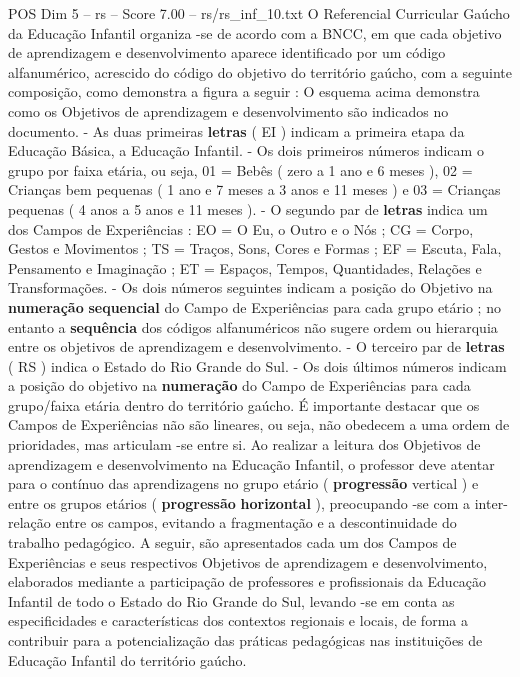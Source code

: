 \begin{textsample}{POS Dim 5 – rs – Score 7.00 – rs/rs\_inf\_10.txt}
O Referencial Curricular Gaúcho da Educação Infantil organiza -se de acordo com a BNCC, em que cada objetivo de aprendizagem e desenvolvimento aparece identificado por um código alfanumérico, acrescido do código do objetivo do território gaúcho, com a seguinte composição, como demonstra a figura a seguir : O esquema acima demonstra como os Objetivos de aprendizagem e desenvolvimento são indicados no documento. - As duas primeiras \textbf{letras} ( EI ) indicam a primeira etapa da Educação Básica, a Educação Infantil. - Os dois primeiros números indicam o grupo por faixa etária, ou seja, 01 = Bebês ( zero a 1 ano e 6 meses ), 02 = Crianças bem pequenas ( 1 ano e 7 meses a 3 anos e 11 meses ) e 03 = Crianças pequenas ( 4 anos a 5 anos e 11 meses ). - O segundo par de \textbf{letras} indica um dos Campos de Experiências : EO = O Eu, o Outro e o Nós ; CG = Corpo, Gestos e Movimentos ; TS = Traços, Sons, Cores e Formas ; EF = Escuta, Fala, Pensamento e Imaginação ; ET = Espaços, Tempos, Quantidades, Relações e Transformações. - Os dois números seguintes indicam a posição do Objetivo na \textbf{numeração} \textbf{sequencial} do Campo de Experiências para cada grupo etário ; no entanto a \textbf{sequência} dos códigos alfanuméricos não sugere ordem ou hierarquia entre os objetivos de aprendizagem e desenvolvimento. - O terceiro par de \textbf{letras} ( RS ) indica o Estado do Rio Grande do Sul. - Os dois últimos números indicam a posição do objetivo na \textbf{numeração} do Campo de Experiências para cada grupo/faixa etária dentro do território gaúcho.
É importante destacar que os Campos de Experiências não são lineares, ou seja, não obedecem a uma ordem de prioridades, mas articulam -se entre si.
Ao realizar a leitura dos Objetivos de aprendizagem e desenvolvimento na Educação Infantil, o professor deve atentar para o contínuo das aprendizagens no grupo etário ( \textbf{progressão} vertical ) e entre os grupos etários ( \textbf{progressão} \textbf{horizontal} ), preocupando -se com a inter-relação entre os campos, evitando a fragmentação e a descontinuidade do trabalho pedagógico.
A seguir, são apresentados cada um dos Campos de Experiências e seus respectivos Objetivos de aprendizagem e desenvolvimento, elaborados mediante a participação de professores e profissionais da Educação Infantil de todo o Estado do Rio Grande do Sul, levando -se em conta as especificidades e características dos contextos regionais e locais, de forma a contribuir para a potencialização das práticas pedagógicas nas instituições de Educação Infantil do território gaúcho.

\end{textsample}
